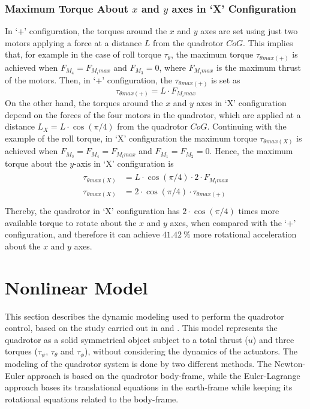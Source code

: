 \subsubsection{Maximum Torque About $x$ and $y$ axes in `X' Configuration}
In `+' configuration, the torques around the $x$ and $y$ axes are set using just two motors applying a force at a distance $L$ from the quadrotor $CoG$. This implies that, for example in the case of roll torque $\tau_\theta$, the maximum torque $\tau_{\theta max (+)}$ is achieved when $F_{M_4} = F_{M_i max}$ and $F_{M_3} = 0$, where $F_{M_i max}$ is the maximum thrust of the motors. Then, in `+' configuration, the $\tau_{\theta max (+)}$ is set as
\begin{equation}
\tau_{\theta max (+)} = L\cdot F_{M_i max}
\end{equation}
On the other hand, the torques around the $x$ and $y$ axes in `X' configuration depend on the forces of the four motors in the quadrotor, which are applied at a distance $L_{X} = L\cdot \cos(\pi/4)$ from the quadrotor $CoG$. Continuing with the example of the roll torque, in `X' configuration the maximum torque $\tau_{\theta max (X)}$ is achieved when $F_{M_3} = F_{M_4} = F_{M_i max}$ and $F_{M_1} = F_{M_2} = 0$. Hence, the maximum torque about the $y$-axis in `X' configuration is
\begin{align}
\begin{split}
\tau_{\theta max (X)} & = L\cdot \cos(\pi/4) \cdot 2 \cdot F_{M_i max}\\[5px]
\tau_{\theta max (X)} & = 2\cdot \cos(\pi/4) \cdot \tau_{\theta max (+)}\\[5px]
\end{split}
\end{align}
Thereby, the quadrotor in `X' configuration has $2\cdot \cos(\pi/4)$ times more available torque to rotate about the $x$ and $y$ axes, when compared with the `+' configuration, and therefore it can achieve $41.42\ \%$ more rotational acceleration about the $x$ and $y$ axes.


\section{Nonlinear Model}
\label{sec:nonlinear}

This section describes the dynamic modeling used to perform the quadrotor control, based on the study carried out in \cite{Bresciani2008} and \cite{Bouabdallah2007}. This model represents the quadrotor as a solid symmetrical object subject to a total thrust ($u$) and three torques ($\tau_\psi$, $\tau_\theta$ and $\tau_\phi$), without considering the dynamics of the actuators. The modeling of the quadrotor system is done by two different methods. The Newton-Euler approach is based on the quadrotor body-frame, while the Euler-Lagrange approach bases its translational equations in the earth-frame while keeping its rotational equations related to the body-frame.


